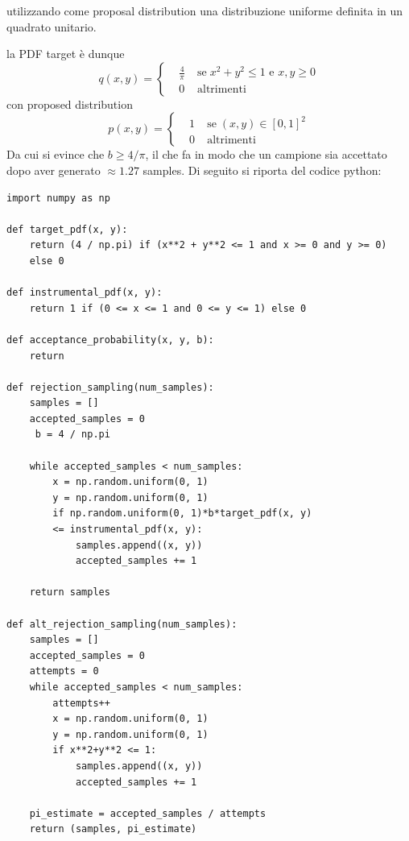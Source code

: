 utilizzando come proposal distribution una distribuzione uniforme definita in un quadrato unitario\footnotemark{}.\par
la PDF target \`e dunque 
\begin{equation}
	q(x,y) = \left\{\begin{aligned}
		&\frac{4}{\pi}\;&\mathrm{se}\;x^2+y^2\leq1\text{ e }x,y\geq0\\
		&0 &\mathrm{altrimenti}
	\end{aligned}\right.
\end{equation}
con proposed distribution 
\begin{equation}
	p(x,y) = \left\{\begin{aligned}
		&1\;&\mathrm{se}\;(x,y)\in[0,1]^2\\
		&0 &\mathrm{altrimenti}
	\end{aligned}\right.
\end{equation}
Da cui si evince che $b\geq4/\pi$, il che fa in modo che un campione sia accettato dopo aver generato $\approx1.27$ samples. Di seguito si riporta del
codice python:
\begin{verbatim}
import numpy as np

def target_pdf(x, y):
    return (4 / np.pi) if (x**2 + y**2 <= 1 and x >= 0 and y >= 0) 
	else 0

def instrumental_pdf(x, y):
    return 1 if (0 <= x <= 1 and 0 <= y <= 1) else 0

def acceptance_probability(x, y, b):
    return 

def rejection_sampling(num_samples):
    samples = []
    accepted_samples = 0
	 b = 4 / np.pi

    while accepted_samples < num_samples:
        x = np.random.uniform(0, 1)
        y = np.random.uniform(0, 1)
        if np.random.uniform(0, 1)*b*target_pdf(x, y) 
		<= instrumental_pdf(x, y):
            samples.append((x, y))
            accepted_samples += 1

    return samples

def alt_rejection_sampling(num_samples):
	samples = []
	accepted_samples = 0
	attempts = 0
    while accepted_samples < num_samples:
		attempts++
        x = np.random.uniform(0, 1)
        y = np.random.uniform(0, 1)
        if x**2+y**2 <= 1:
            samples.append((x, y))
            accepted_samples += 1

	pi_estimate = accepted_samples / attempts
	return (samples, pi_estimate)
\end{verbatim}
